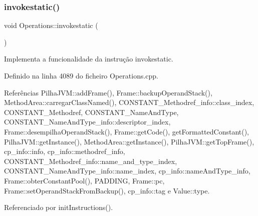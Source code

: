 \subsubsection{\texorpdfstring{invokestatic()}{invokestatic()}}
{\footnotesize\ttfamily void Operations\+::invokestatic (\begin{DoxyParamCaption}{ }\end{DoxyParamCaption})\hspace{0.3cm}{\ttfamily [private]}}



Implementa a funcionalidade da instrução invokestatic. 



Definido na linha 4089 do ficheiro Operations.\+cpp.



Referências Pilha\+J\+V\+M\+::add\+Frame(), Frame\+::backup\+Operand\+Stack(), Method\+Area\+::carregar\+Class\+Named(), C\+O\+N\+S\+T\+A\+N\+T\+\_\+\+Methodref\+\_\+info\+::class\+\_\+index, C\+O\+N\+S\+T\+A\+N\+T\+\_\+\+Methodref, C\+O\+N\+S\+T\+A\+N\+T\+\_\+\+Name\+And\+Type, C\+O\+N\+S\+T\+A\+N\+T\+\_\+\+Name\+And\+Type\+\_\+info\+::descriptor\+\_\+index, Frame\+::desempilha\+Operand\+Stack(), Frame\+::get\+Code(), get\+Formatted\+Constant(), Pilha\+J\+V\+M\+::get\+Instance(), Method\+Area\+::get\+Instance(), Pilha\+J\+V\+M\+::get\+Top\+Frame(), cp\+\_\+info\+::info, cp\+\_\+info\+::methodref\+\_\+info, C\+O\+N\+S\+T\+A\+N\+T\+\_\+\+Methodref\+\_\+info\+::name\+\_\+and\+\_\+type\+\_\+index, C\+O\+N\+S\+T\+A\+N\+T\+\_\+\+Name\+And\+Type\+\_\+info\+::name\+\_\+index, cp\+\_\+info\+::name\+And\+Type\+\_\+info, Frame\+::obter\+Constant\+Pool(), P\+A\+D\+D\+I\+NG, Frame\+::pc, Frame\+::set\+Operand\+Stack\+From\+Backup(), cp\+\_\+info\+::tag e Value\+::type.



Referenciado por init\+Instructions().


